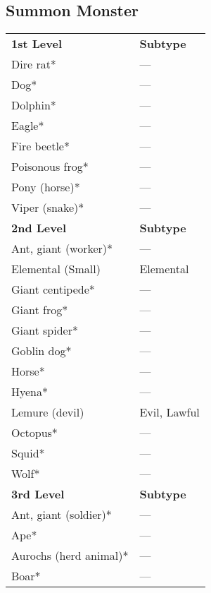 \subsection{Summon Monster}
\begin{xtabular}{ll}
\textbf{1st Level}        & \textbf{Subtype} \\
Dire rat*                 & ---                \\
Dog*                      & ---                \\
Dolphin*                  & ---                \\
Eagle*                    & ---                \\
Fire beetle*              & ---                \\
Poisonous frog*           & ---                \\
Pony (horse)*             & ---                \\
Viper (snake)*            & ---                \\
\textbf{2nd Level}        & \textbf{Subtype} \\
Ant, giant (worker)*      & ---                \\
Elemental (Small)         & Elemental        \\
Giant centipede*          & ---                \\
Giant frog*               & ---                \\
Giant spider*             & ---                \\
Goblin dog*               & ---                \\
Horse*                    & ---                \\
Hyena*                    & ---                \\
Lemure (devil)            & Evil, Lawful     \\
Octopus*                  & ---                \\
Squid*                    & ---                \\
Wolf*                     & ---                \\
\textbf{3rd Level}        & \textbf{Subtype} \\
Ant, giant (soldier)*     & ---                \\
Ape*                      & ---                \\
Aurochs (herd animal)*    & ---                \\
Boar*                     & ---                \\

\end{xtabular}
